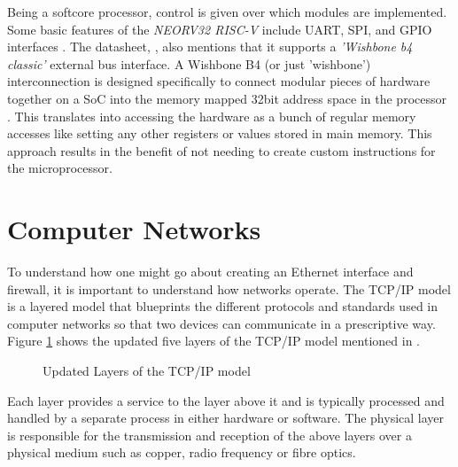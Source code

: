 Being a softcore processor, control is given over which modules are implemented. Some basic features of the \textit{NEORV32 RISC-V} include 
UART, SPI, and GPIO interfaces \cite{neorv32Datasheet}. The datasheet, \cite{neorv32Datasheet}, also mentions that it supports a \textit{'Wishbone b4 classic'} 
external bus interface. A Wishbone B4 (or just 'wishbone') interconnection is designed specifically to connect modular pieces of hardware together on a 
SoC into the memory mapped 32bit address space in the processor \cite{WishboneSpec}. This translates into accessing the hardware as a bunch of regular memory accesses like setting any other registers or values stored in main memory. This approach results in the benefit of not needing to create custom 
instructions for the microprocessor. 







\section{Computer Networks}
\label{sec:computer_networks}
To understand how one might go about creating an Ethernet interface and firewall, it is important to understand how networks operate. The TCP/IP model is a layered model that blueprints the different protocols and standards used in computer networks so that two devices can communicate in a prescriptive way. 
Figure \ref{fig:tcp_ip_model} shows the updated five layers of the TCP/IP model mentioned in \cite{ciscoCCNABook}.


\begin{figure}[H]
    \centering
    \caption{Updated Layers of the TCP/IP model}
    \label{fig:tcp_ip_model}
\end{figure}

Each layer provides a service to the layer above it and is typically processed and handled by a separate process in either hardware or software. The physical layer is responsible for the transmission and reception of the above layers over a physical medium such as copper, radio frequency or fibre optics. 

